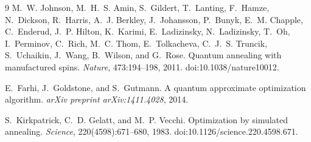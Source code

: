 \documentclass[12pt, a4paper]{article}
\theoremstyle{remark}
\begin{document}
\begin{thebibliography}{9}
M.~W. Johnson, M.~H.~S. Amin, S.~Gildert, T.~Lanting, F.~Hamze, N.~Dickson,
  R.~Harris, A.~J. Berkley, J.~Johansson, P.~Bunyk, E.~M. Chapple,
  C.~Enderud, J.~P. Hilton, K.~Karimi, E.~Ladizinsky, N.~Ladizinsky, T.~Oh,
  I.~Perminov, C.~Rich, M.~C. Thom, E.~Tolkacheva, C.~J.~S. Truncik,
  S.~Uchaikin, J.~Wang, B.~Wilson, and G.~Rose.
\newblock Quantum annealing with manufactured spins.
\newblock \textit{Nature}, 473:194--198, 2011.
\newblock doi:10.1038/nature10012.

E.~Farhi, J.~Goldstone, and S.~Gutmann.
\newblock A quantum approximate optimization algorithm.
\newblock \textit{arXiv preprint arXiv:1411.4028}, 2014.

S.~Kirkpatrick, C.~D. Gelatt, and M.~P. Vecchi.
\newblock Optimization by simulated annealing.
\newblock \textit{Science}, 220(4598):671--680, 1983.
\newblock doi:10.1126/science.220.4598.671.

\end{thebibliography}
\end{document}
